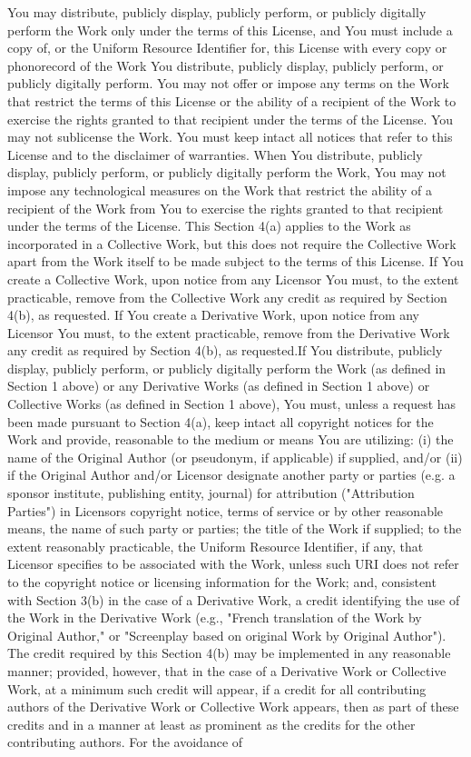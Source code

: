 You may distribute, publicly display, publicly perform, or publicly digitally perform the Work only under the terms of this License, and You must include a copy of, or the Uniform Resource Identifier for, this License with every copy or phonorecord of the Work You distribute, publicly display, publicly perform, or publicly digitally perform. You may not offer or impose any terms on the Work that restrict the terms of this License or the ability of a recipient of the Work to exercise the rights granted to that recipient under the terms of the License. You may not sublicense the Work. You must keep intact all notices that refer to this License and to the disclaimer of warranties. When You distribute, publicly display, publicly perform, or publicly digitally perform the Work, You may not impose any technological measures on the Work that restrict the ability of a recipient of the Work from You to exercise the rights granted to that recipient under the terms of the License. This Section 4(a) applies to the Work as incorporated in a Collective Work, but this does not require the Collective Work apart from the Work itself to be made subject to the terms of this License. If You create a Collective Work, upon notice from any Licensor You must, to the extent practicable, remove from the Collective Work any credit as required by Section 4(b), as requested. If You create a Derivative Work, upon notice from any Licensor You must, to the extent practicable, remove from the Derivative Work any credit as required by Section 4(b), as requested.\+If You distribute, publicly display, publicly perform, or publicly digitally perform the Work (as defined in Section 1 above) or any Derivative Works (as defined in Section 1 above) or Collective Works (as defined in Section 1 above), You must, unless a request has been made pursuant to Section 4(a), keep intact all copyright notices for the Work and provide, reasonable to the medium or means You are utilizing\+: (i) the name of the Original Author (or pseudonym, if applicable) if supplied, and/or (ii) if the Original Author and/or Licensor designate another party or parties (e.\+g. a sponsor institute, publishing entity, journal) for attribution ("{}\+Attribution Parties"{}) in Licensor\textquotesingle{}s copyright notice, terms of service or by other reasonable means, the name of such party or parties; the title of the Work if supplied; to the extent reasonably practicable, the Uniform Resource Identifier, if any, that Licensor specifies to be associated with the Work, unless such URI does not refer to the copyright notice or licensing information for the Work; and, consistent with Section 3(b) in the case of a Derivative Work, a credit identifying the use of the Work in the Derivative Work (e.\+g., "{}\+French translation of the Work by Original Author,"{} or "{}\+Screenplay based on original Work by Original Author"{}). The credit required by this Section 4(b) may be implemented in any reasonable manner; provided, however, that in the case of a Derivative Work or Collective Work, at a minimum such credit will appear, if a credit for all contributing authors of the Derivative Work or Collective Work appears, then as part of these credits and in a manner at least as prominent as the credits for the other contributing authors. For the avoidance of 